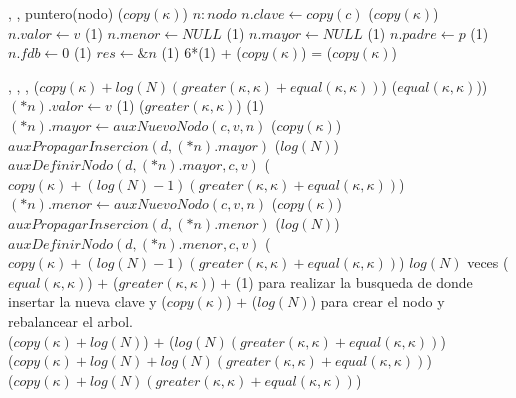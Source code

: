 {   ,
    ,
    }
{puntero(nodo)}
{\bigo($copy(\kappa)$)}
{   \var $n : nodo$
    \State $n.clave \gets copy(c)$              \comment \bigo($copy(\kappa)$)
    \State $n.valor \gets v$                    \comment \bigo(1)
    \State $n.menor \gets NULL$                 \comment \bigo(1)
    \State $n.mayor \gets NULL$                 \comment \bigo(1)
    \State $n.padre \gets p$                    \comment \bigo(1)
    \State $n.fdb \gets 0$                      \comment \bigo(1)
    \State $res \gets \&n$                      \comment \bigo(1)
}
{   6*\bigo(1) + \bigo($copy(\kappa)$) = \bigo($copy(\kappa)$) }

{   ,
    ,
    ,
    }
{}
{\bigo($copy(\kappa)+log(N)(greater(\kappa, \kappa)+equal(\kappa, \kappa))$)}
{                                                  \comment \bigo($equal(\kappa, \kappa)$))
        \State $(*n).valor \gets v$                                     \comment \bigo(1)
    \Else
                                                   \comment \bigo($greater(\kappa, \kappa)$)
                                                \comment \bigo(1)
                \State $(*n).mayor \gets auxNuevoNodo(c, v, n)$         \comment \bigo($copy(\kappa)$)
                \State $auxPropagarInsercion(d, (*n).mayor)$            \comment \bigo($log(N)$)
            \Else
                \State $auxDefinirNodo(d, (*n).mayor, c, v)$            \comment \bigo($copy(\kappa)+(log(N)-1)(greater(\kappa, \kappa)+equal(\kappa, \kappa))$)
            \EndIf
        \Else   
                \State $(*n).menor \gets auxNuevoNodo(c, v, n)$         \comment \bigo($copy(\kappa)$)
                \State $auxPropagarInsercion(d, (*n).menor)$            \comment \bigo($log(N)$)
            \Else 
                \State $auxDefinirNodo(d, (*n).menor, c, v)$            \comment \bigo($copy(\kappa)+(log(N)-1)(greater(\kappa, \kappa)+equal(\kappa, \kappa))$)
            \EndIf
        \EndIf
    \EndIf
}
{   $log(N)$ veces \bigo($equal(\kappa, \kappa)$) $+$ \bigo($greater(\kappa, \kappa)$) $+$ \bigo(1)
    para realizar la busqueda de donde insertar la nueva clave y \bigo($copy(\kappa)$) $+$ \bigo($log(N)$)
    para crear el nodo y rebalancear el arbol. \\
    \hspace*{8em} \bigo($copy(\kappa)+log(N)$) $+$ \bigo($log(N)(greater(\kappa, \kappa)+equal(\kappa, \kappa))$) \\
    \hspace*{8em} \bigo($copy(\kappa)+log(N) + log(N)(greater(\kappa, \kappa)+equal(\kappa, \kappa))$) \\
    \hspace*{8em} \bigo($copy(\kappa)+log(N)(greater(\kappa, \kappa)+equal(\kappa, \kappa))$)
}


